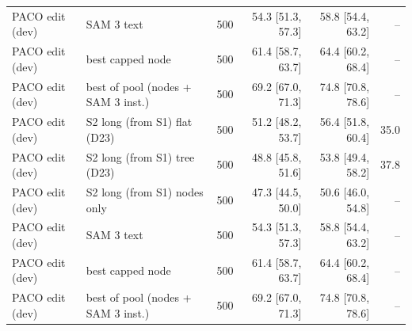 \begin{tabular}{llrrrr}
PACO edit (dev) & SAM 3 text & 500 & 54.3 \scriptsize{[51.3, 57.3]} & 58.8 \scriptsize{[54.4, 63.2]} & -- \\
PACO edit (dev) & best capped node & 500 & 61.4 \scriptsize{[58.7, 63.7]} & 64.4 \scriptsize{[60.2, 68.4]} & -- \\
PACO edit (dev) & best of pool (nodes + SAM 3 inst.) & 500 & 69.2 \scriptsize{[67.0, 71.3]} & 74.8 \scriptsize{[70.8, 78.6]} & -- \\
\midrule
PACO edit (dev) & S2 long (from S1) flat (D23) & 500 & 51.2 \scriptsize{[48.2, 53.7]} & 56.4 \scriptsize{[51.8, 60.4]} & 35.0 \\
PACO edit (dev) & S2 long (from S1) tree (D23) & 500 & 48.8 \scriptsize{[45.8, 51.6]} & 53.8 \scriptsize{[49.4, 58.2]} & 37.8 \\
PACO edit (dev) & S2 long (from S1) nodes only & 500 & 47.3 \scriptsize{[44.5, 50.0]} & 50.6 \scriptsize{[46.0, 54.8]} & -- \\
PACO edit (dev) & SAM 3 text & 500 & 54.3 \scriptsize{[51.3, 57.3]} & 58.8 \scriptsize{[54.4, 63.2]} & -- \\
PACO edit (dev) & best capped node & 500 & 61.4 \scriptsize{[58.7, 63.7]} & 64.4 \scriptsize{[60.2, 68.4]} & -- \\
PACO edit (dev) & best of pool (nodes + SAM 3 inst.) & 500 & 69.2 \scriptsize{[67.0, 71.3]} & 74.8 \scriptsize{[70.8, 78.6]} & -- \\
\bottomrule
\end{tabular}
